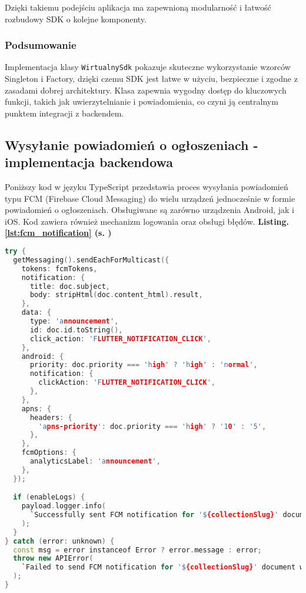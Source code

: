 Dzięki takiemu podejściu aplikacja ma zapewnioną modularność i łatwość rozbudowy SDK o kolejne komponenty.

\subsubsection{Podsumowanie}
Implementacja klasy \texttt{WirtualnySdk} pokazuje skuteczne wykorzystanie wzorców Singleton i Factory, dzięki czemu SDK jest łatwe w użyciu, bezpieczne i zgodne z zasadami dobrej architektury. Klasa zapewnia wygodny dostęp do kluczowych funkcji, takich jak uwierzytelnianie i powiadomienia, co czyni ją centralnym punktem integracji z backendem.

\subsection{Wysyłanie powiadomień o ogłoszeniach - implementacja backendowa}

Poniższy kod w języku TypeScript przedstawia proces wysyłania powiadomień typu FCM (Firebase Cloud Messaging) do wielu urządzeń jednocześnie w formie powiadomień o ogłoszeniach. Obsługiwane są zarówno urządzenia Android, jak i iOS. Kod zawiera również mechanizm logowania oraz obsługi błędów. \textbf{Listing. \ref{lst:fcm_notification} (s. \pageref{lst:fcm_notification})}

\begin{lstlisting}[language=c++, caption={Implementacja wysyłania powiadomień FCM}, label={lst:fcm_notification}]
try {
  getMessaging().sendEachForMulticast({
    tokens: fcmTokens,
    notification: {
      title: doc.subject,
      body: stripHtml(doc.content_html).result,
    },
    data: {
      type: 'announcement',
      id: doc.id.toString(),
      click_action: 'FLUTTER_NOTIFICATION_CLICK',
    },
    android: {
      priority: doc.priority === 'high' ? 'high' : 'normal',
      notification: {
        clickAction: 'FLUTTER_NOTIFICATION_CLICK',
      },
    },
    apns: {
      headers: {
        'apns-priority': doc.priority === 'high' ? '10' : '5',
      },
    },
    fcmOptions: {
      analyticsLabel: 'announcement',
    },
  });

  if (enableLogs) {
    payload.logger.info(
      `Successfully sent FCM notification for '${collectionSlug}' document with ID: '${doc.id}''.`,
    );
  }
} catch (error: unknown) {
  const msg = error instanceof Error ? error.message : error;
  throw new APIError(
    `Failed to send FCM notification for '${collectionSlug}' document with ID: '${doc.id}': ${msg}'.`,
  );
}
\end{lstlisting}

